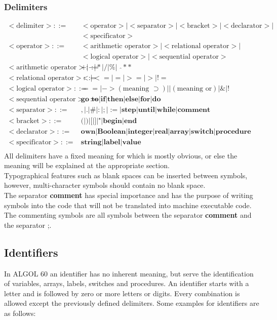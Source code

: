 \documentclass{article}
\begin{document}
\subsubsection{Delimiters}
\begin{equation} \label{eq5}
\begin{split}
<\text{delimiter}> ::=&<\text{operator}>|<\text{separator}>|<\text{bracket}>|<\text{declarator}>|\\&<\text{specificator}> \\
<\text{operator}> ::=&<\text{arithmetic operator}>|<\text{relational operator}>|\\&<\text{logical operator}>|<\text{sequential operator}> \\
<\text{arithmetic operator}> ::=&+|-|*|/|\%|\text{ }\hat{} \ast \ast \\
<\text{relational operator}> ::=&<|<=|=|>=|>|!= \\
<\text{logical operator}> ::=&==|->(\text{meaning }\supset)||(\text{meaning or})|\&|!\\
<\text{sequential operator}> ::=&\textbf{go to}|\textbf{if}|\textbf{then}|\textbf{else}|\textbf{for}|\textbf{do}\\
<\text{separator}> ::=&,|.|\#|:|;|:=|\textbf{step}|\textbf{until}|\textbf{while}|\textbf{comment}\\
<\text{bracket}> ::=&\text{(}|\text{)}|\text{[}|\text{]}|\text{"}|\textbf{begin}|\textbf{end}\\
<\text{declarator}> ::=&\textbf{own}|\textbf{Boolean}|\textbf{integer}|\textbf{real}|\textbf{array}|\textbf{switch}|\textbf{procedure}\\
<\text{specificator}> ::=&\textbf{string}|\textbf{label}|\textbf{value}\\
\end{split}
\end{equation}
All delimiters have a fixed meaning for which is mostly obvious, or else the meaning will be explained at the appropriate section.\\
Typographical features such as blank spaces can be inserted between symbols, however, multi-character symbols should contain no blank space.\\
The separator \textbf{comment} has special importance and has the purpose of writing symbols into the code that will not be translated into machine executable code. The commenting symbols are all symbols between the separator \textbf{comment} and the separator ;.

\subsection{Identifiers}
In ALGOL 60 an identifier has no inherent meaning, but serve the identification of variables, arrays, labels, switches and procedures. An identifier starts with a letter and is followed by zero or more letters or digits. Every combination is allowed except the previously defined delimiters. Some examples for identifiers are as follows:\\
\end{document}
